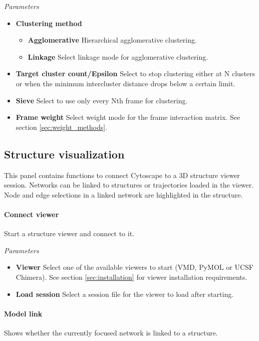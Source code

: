 \textit{Parameters}
\begin{itemize}
\item \textbf{Clustering method}
  \begin{itemize}
    \item \textbf{Agglomerative} Hierarchical agglomerative clustering.
    \item \textbf{Linkage} Select linkage mode for agglomerative clustering.
    \end{itemize}
  \item \textbf{Target cluster count/Epsilon} Select to stop clustering either at N clusters or when the minimum intercluster distance drops below a certain limit.
  \item \textbf{Sieve} Select to use only every Nth frame for clustering.
  \item \textbf{Frame weight} Select weight mode for the frame interaction matrix. See section \ref{sec:weight_methods}.
    \end{itemize}
      
      
\subsection{Structure visualization}

This panel contains functions to connect Cytoscape to a 3D structure viewer session. Networks can be linked to structures or trajectories loaded in the viewer. Node and edge selections in a linked network are highlighted in the structure. 

\paragraph{Connect viewer} Start a structure viewer and connect to it.

\textit{Parameters}
\begin{itemize}
  \item \textbf{Viewer} Select one of the available viewers to start (VMD, PyMOL or UCSF Chimera). See section \ref{sec:installation} for viewer installation requirements.
  \item \textbf{Load session} Select a session file for the viewer to load after starting. 
\end{itemize}

\paragraph{Model link} Shows whether the currently focused network is linked to a structure.

